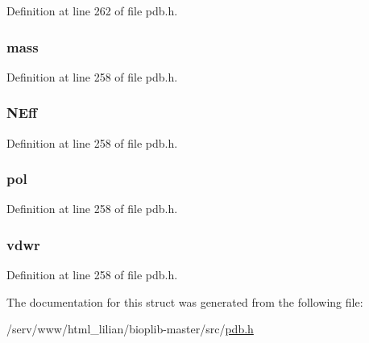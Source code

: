 Definition at line 262 of file pdb.\-h.

\hypertarget{struct__bl_atom_info_a7709794c305d62392e3311b11def51d2}{
\subsubsection[{mass}]{ mass}}\label{struct__bl_atom_info_a7709794c305d62392e3311b11def51d2}


Definition at line 258 of file pdb.\-h.

\hypertarget{struct__bl_atom_info_ad12549b89f9994f60f6fff31d1b47e3c}{
\subsubsection[{N\-Eff}]{ N\-Eff}}\label{struct__bl_atom_info_ad12549b89f9994f60f6fff31d1b47e3c}


Definition at line 258 of file pdb.\-h.

\hypertarget{struct__bl_atom_info_ae7fb48fccd858aaea009b0f834f04d00}{
\subsubsection[{pol}]{ pol}}\label{struct__bl_atom_info_ae7fb48fccd858aaea009b0f834f04d00}


Definition at line 258 of file pdb.\-h.

\hypertarget{struct__bl_atom_info_a895ae3f24189fb46b3a5a753260d34f8}{
\subsubsection[{vdwr}]{ vdwr}}\label{struct__bl_atom_info_a895ae3f24189fb46b3a5a753260d34f8}


Definition at line 258 of file pdb.\-h.



The documentation for this struct was generated from the following file\-:\begin{DoxyCompactItemize}
\item 
/serv/www/html\-\_\-lilian/bioplib-\/master/src/\hyperlink{pdb_8h}{pdb.\-h}\end{DoxyCompactItemize}
